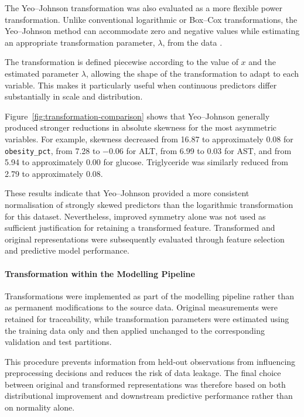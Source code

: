 The Yeo--Johnson transformation was also evaluated as a more flexible power
transformation. Unlike conventional logarithmic or Box--Cox transformations,
the Yeo--Johnson method can accommodate zero and negative values while
estimating an appropriate transformation parameter, $\lambda$, from the data
\parencite{yeo2000new}.

The transformation is defined piecewise according to the value of $x$ and the
estimated parameter $\lambda$, allowing the shape of the transformation to
adapt to each variable. This makes it particularly useful when continuous
predictors differ substantially in scale and distribution.

Figure~\ref{fig:transformation-comparison} shows that Yeo--Johnson generally
produced stronger reductions in absolute skewness for the most asymmetric
variables. For example, skewness decreased from 16.87 to approximately 0.08
for \texttt{obesity\_pct}, from 7.28 to $-0.06$ for ALT, from 6.99 to 0.03
for AST, and from 5.94 to approximately 0.00 for glucose. Triglyceride was
similarly reduced from 2.79 to approximately 0.08.

These results indicate that Yeo--Johnson provided a more consistent
normalisation of strongly skewed predictors than the logarithmic
transformation for this dataset. Nevertheless, improved symmetry alone was not
used as sufficient justification for retaining a transformed feature.
Transformed and original representations were subsequently evaluated through
feature selection and predictive model performance.


\paragraph{Transformation within the Modelling Pipeline}
\label{subsubsec:transformation-pipeline}

Transformations were implemented as part of the modelling pipeline rather than
as permanent modifications to the source data. Original measurements were
retained for traceability, while transformation parameters were estimated using
the training data only and then applied unchanged to the corresponding
validation and test partitions.

This procedure prevents information from held-out observations from influencing
preprocessing decisions and reduces the risk of data leakage. The final choice
between original and transformed representations was therefore based on both
distributional improvement and downstream predictive performance rather than on
normality alone.
